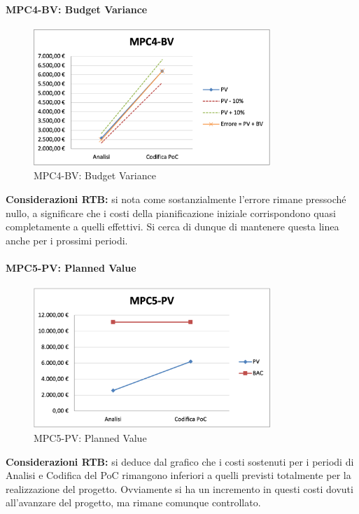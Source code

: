 \newpage
\paragraph{MPC4-BV: Budget Variance}
\begin{figure}[h!] 
    \centering
    \includegraphics[width=0.8\textwidth]{images/MPC4-BV.png}
    \caption{MPC4-BV: Budget Variance}
\end{figure}
\noindent \textbf{Considerazioni RTB:} si nota come sostanzialmente l'errore rimane pressoché nullo, a significare che i costi della pianificazione iniziale corrispondono quasi completamente a quelli effettivi. Si cerca di dunque di mantenere questa linea anche per i prossimi periodi.

\paragraph{MPC5-PV: Planned Value}
\begin{figure}[h!]
    \centering
    \includegraphics[width=0.8\textwidth]{images/MPC5-PV.png}
    \caption{MPC5-PV: Planned Value}
\end{figure}
\noindent \textbf{Considerazioni RTB:} si deduce dal grafico che i costi sostenuti per i periodi di Analisi e Codifica del PoC rimangono inferiori a quelli previsti totalmente per la realizzazione del progetto. Ovviamente si ha un incremento in questi costi dovuti all'avanzare del progetto, ma rimane comunque controllato.


